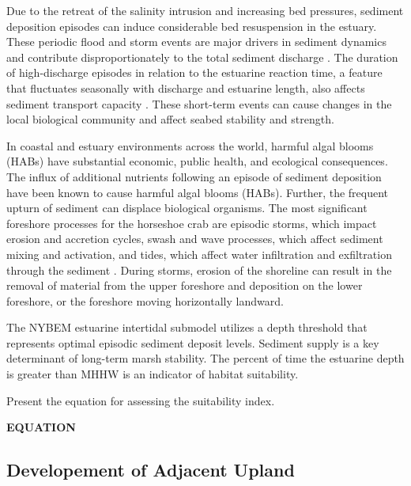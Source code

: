 \documentclass[
]{book}
\begin{document}
Due to the retreat of the salinity intrusion and increasing bed pressures, sediment deposition episodes can induce considerable bed resuspension in the estuary. These periodic flood and storm events are major drivers in sediment dynamics and contribute disproportionately to the total sediment discharge \citep{ralston_sediment_2013}. The duration of high-discharge episodes in relation to the estuarine reaction time, a feature that fluctuates seasonally with discharge and estuarine length, also affects sediment transport capacity \citep{palinkas_sediment_2014}. These short-term events can cause changes in the local biological community and affect seabed stability and strength.

In coastal and estuary environments across the world, harmful algal blooms (HABs) have substantial economic, public health, and ecological consequences. The influx of additional nutrients following an episode of sediment deposition have been known to cause harmful algal blooms (HABs)\citep{ralston_temperature_2014}. Further, the frequent upturn of sediment can displace biological organisms. The most significant foreshore processes for the horseshoe crab are episodic storms, which impact erosion and accretion cycles, swash and wave processes, which affect sediment mixing and activation, and tides, which affect water infiltration and exfiltration through the sediment \citep{nancy_jackson_armoring_2010}. During storms, erosion of the shoreline can result in the removal of material from the upper foreshore and deposition on the lower foreshore, or the foreshore moving horizontally landward.

The NYBEM estuarine intertidal submodel utilizes a depth threshold that represents optimal episodic sediment deposit levels. Sediment supply is a key determinant of long-term marsh stability. The percent of time the estuarine depth is greater than MHHW is an indicator of habitat suitability.

Present the equation for assessing the suitability index.

\textbf{EQUATION}

\hypertarget{developement-of-adjacent-upland}{%
\subsection{Developement of Adjacent Upland}\label{developement-of-adjacent-upland}}
\end{document}
